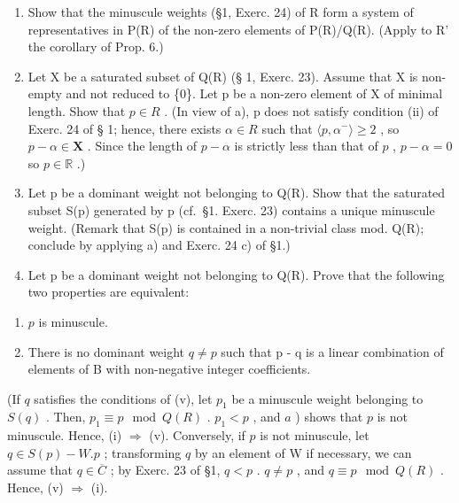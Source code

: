 \begin{enumerate}
\def\labelenumi{\alph{enumi})}
\item
  Show that the minuscule weights (§1, Exerc. 24) of R form a system of representatives in P(R) of the non-zero elements of P(R)/Q(R). (Apply to R' the corollary of Prop. 6.)
\item
  Let X be a saturated subset of Q(R) (§ 1, Exerc. 23). Assume that X is non-empty and not reduced to \{0\}. Let p be a non-zero element of X of minimal length. Show that \(p \in R\) . (In view of a), p does not satisfy condition (ii) of Exerc. 24 of § 1; hence, there exists \(\alpha \in R\) such that \(\langle p, \alpha^{-} \rangle \geqslant 2\) , so \(p - \alpha \in \mathbf{X}\) . Since the length of \(p - \alpha\) is strictly less than that of \(p\) , \(p - \alpha = 0\) so \(p \in \mathbb{R}\) .)
\item
  Let p be a dominant weight not belonging to Q(R). Show that the saturated subset S(p) generated by p (cf.~§1. Exerc. 23) contains a unique minuscule weight. (Remark that S(p) is contained in a non-trivial class mod. Q(R); conclude by applying a) and Exerc. 24 c) of §1.)
\item
  Let p be a dominant weight not belonging to Q(R). Prove that the following two properties are equivalent:
\end{enumerate}

\begin{enumerate}
\def\labelenumi{(\roman{enumi})}
\item
  \(p\) is minuscule.
\item
  There is no dominant weight \(q \neq p\) such that p - q is a linear combination of elements of B with non-negative integer coefficients.
\end{enumerate}

(If \(q\) satisfies the conditions of (v), let \(p_1\) be a minuscule weight belonging to \(S(q)\) . Then, \(p_1 \equiv p \mod Q(R)\) . \(p_1 < p\) , and \(a\) ) shows that \(p\) is not minuscule. Hence, (i) \(\Longrightarrow\) (v). Conversely, if \(p\) is not minuscule, let \(q \in S(p) - W.p\) ; transforming \(q\) by an element of W if necessary, we can assume that \(q \in \overline{C}\) ; by Exerc. 23 of §1, \(q < p\) . \(q \neq p\) , and \(q \equiv p \mod Q(R)\) . Hence, (v) \(\Longrightarrow\) (i).

